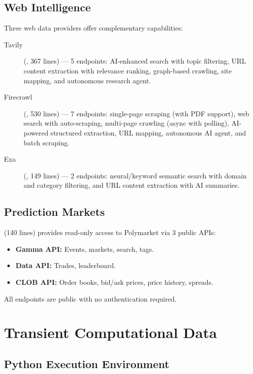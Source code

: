 \subsection{Web Intelligence}

Three web data providers offer complementary capabilities:

\begin{description}
  \item[Tavily] (, 367 lines) --- 5 endpoints: AI-enhanced search with topic filtering, URL content extraction with relevance ranking, graph-based crawling, site mapping, and autonomous research agent.

  \item[Firecrawl] (, 530 lines) --- 7 endpoints: single-page scraping (with PDF support), web search with auto-scraping, multi-page crawling (async with polling), AI-powered structured extraction, URL mapping, autonomous AI agent, and batch scraping.

  \item[Exa] (, 149 lines) --- 2 endpoints: neural/keyword semantic search with domain and category filtering, and URL content extraction with AI summaries.
\end{description}

\subsection{Prediction Markets}

 (140 lines) provides read-only access to Polymarket via 3 public APIs:

\begin{itemize}
  \item \textbf{Gamma API:} Events, markets, search, tags.
  \item \textbf{Data API:} Trades, leaderboard.
  \item \textbf{CLOB API:} Order books, bid/ask prices, price history, spreads.
\end{itemize}

All endpoints are public with no authentication required.

\section{Transient Computational Data}
\label{sec:data:transient}

\subsection{Python Execution Environment}

